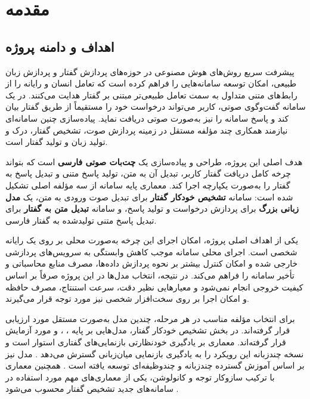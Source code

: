 \chapter{مقدمه}

\section{اهداف و دامنه پروژه}

پیشرفت سریع روش‌های هوش مصنوعی در حوزه‌های پردازش گفتار و
پردازش زبان طبیعی، امکان توسعه سامانه‌هایی را فراهم کرده است که
تعامل انسان و رایانه را از رابط‌های متنی متداول به سمت تعامل طبیعی‌تر
مبتنی بر گفتار هدایت می‌کنند.
در یک سامانه گفت‌وگوی صوتی، کاربر می‌تواند درخواست خود را مستقیماً
از طریق گفتار بیان کند و پاسخ سامانه را نیز به‌صورت صوتی دریافت نماید.
پیاده‌سازی چنین سامانه‌ای نیازمند همکاری چند مؤلفه مستقل در زمینه
پردازش صوت، تشخیص گفتار، درک و تولید زبان و تولید گفتار است.

هدف اصلی این پروژه، طراحی و پیاده‌سازی یک
\textbf{چت‌بات صوتی فارسی}
است که بتواند چرخه کامل دریافت گفتار کاربر، تبدیل آن به متن،
تولید پاسخ متنی و تبدیل پاسخ به گفتار را به‌صورت یکپارچه اجرا کند.
معماری پایه سامانه از سه مؤلفه اصلی تشکیل شده است:
سامانه
\textbf{تشخیص خودکار گفتار}
برای تبدیل صوت ورودی به متن،
یک
\textbf{مدل زبانی بزرگ}
برای پردازش درخواست و تولید پاسخ،
و سامانه
\textbf{تبدیل متن به گفتار}
برای تبدیل پاسخ متنی تولیدشده به گفتار فارسی.

یکی از اهداف اصلی پروژه، امکان اجرای این چرخه به‌صورت محلی
بر روی یک رایانه شخصی است.
اجرای محلی سامانه موجب کاهش وابستگی به سرویس‌های پردازشی خارجی
شده و امکان کنترل بیشتر بر نحوه پردازش داده‌ها، مصرف منابع محاسباتی
و تأخیر سامانه را فراهم می‌کند.
در نتیجه، انتخاب مدل‌ها در این پروژه صرفاً بر اساس کیفیت خروجی
انجام نمی‌شود و معیارهایی نظیر دقت، سرعت استنتاج، مصرف حافظه
و امکان اجرا بر روی سخت‌افزار شخصی نیز مورد توجه قرار می‌گیرند.

برای انتخاب مؤلفه مناسب در هر مرحله، چندین مدل به‌صورت مستقل
مورد ارزیابی قرار گرفته‌اند.
در بخش تشخیص خودکار گفتار، مدل‌هایی بر پایه
، ، 
و 
مورد آزمایش قرار گرفته‌اند.
معماری  بر یادگیری خودنظارتی بازنمایی‌های گفتاری
استوار است \cite{baevski2020wav2vec2} و نسخه چندزبانه
 این رویکرد را به یادگیری بازنمایی میان‌زبانی گسترش
می‌دهد \cite{conneau2020xlsr}.
مدل  نیز بر اساس آموزش گسترده چندزبانه و چندوظیفه‌ای
توسعه یافته است \cite{radford2022whisper}.
همچنین معماری  با ترکیب سازوکار توجه و کانولوشن،
یکی از معماری‌های مهم مورد استفاده در سامانه‌های جدید تشخیص گفتار
محسوب می‌شود \cite{gulati2020conformer}.

